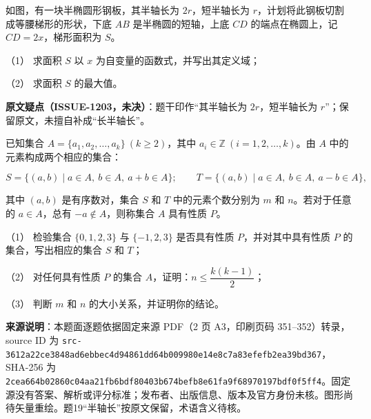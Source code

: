 \begin{question}
如图，有一块半椭圆形钢板，其半轴长为 $2r$，短半轴长为 $r$，计划将此钢板切割成等腰梯形的形状，下底 $AB$ 是半椭圆的短轴，上底 $CD$ 的端点在椭圆上，记 $CD=2x$，梯形面积为 $S$。

（1） 求面积 $S$ 以 $x$ 为自变量的函数式，并写出其定义域；

（2） 求面积 $S$ 的最大值。
\nopagebreak[4]
\begin{center}\end{center}
\nopagebreak[4]
\begin{gktip}

\textbf{原文疑点（ISSUE-1203，未决）}：题干印作“其半轴长为 $2r$，短半轴长为 $r$”；保留原文，未擅自补成“长半轴长”。
\end{gktip}

\end{question}
\begin{question}
已知集合 $A=\{a_1,a_2,\ldots,a_k\}\ (k\geq 2)$，其中 $a_i\in\mathbb{Z}\ (i=1,2,\ldots,k)$。由 $A$ 中的元素构成两个相应的集合：

\nopagebreak[4]
\[
S=\{(a,b)\mid a\in A,\ b\in A,\ a+b\in A\};\qquad
T=\{(a,b)\mid a\in A,\ b\in A,\ a-b\in A\},
\]

其中 $(a,b)$ 是有序数对，集合 $S$ 和 $T$ 中的元素个数分别为 $m$ 和 $n$。若对于任意的 $a\in A$，总有 $-a\notin A$，则称集合 $A$ 具有性质 $P$。

（1） 检验集合 $\{0,1,2,3\}$ 与 $\{-1,2,3\}$ 是否具有性质 $P$，并对其中具有性质 $P$ 的集合，写出相应的集合 $S$ 和 $T$；

（2） 对任何具有性质 $P$ 的集合 $A$，证明：$n\leq \dfrac{k(k-1)}2$；

（3） 判断 $m$ 和 $n$ 的大小关系，并证明你的结论。

\begin{gktip}
\textbf{来源说明}：本题面逐题依据固定来源 PDF（2 页 A3，印刷页码 351–352）转录，source ID 为 \texttt{src-3612a22ce3848ad6ebbec4d94861dd64b009980e14e8c7a83efefb2ea39bd367}，SHA-256 为 \texttt{2cea664b02860c04aa21fb6bdf80403b674befb8e61fa9f68970197bdf0f5ff4}。固定源没有答案、解析或评分标准；发布者、出版信息、版本及官方身份未核。图形尚待矢量重绘。题19“半轴长”按原文保留，术语含义待核。
\end{gktip}

\end{question}